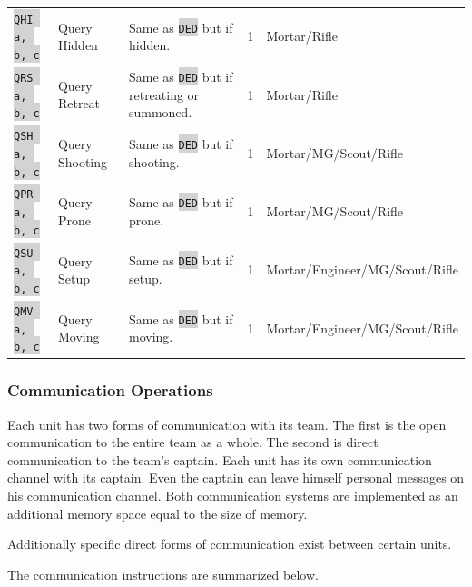 \documentclass{article}
\newcommand{\vnscode}[1]{\colorbox{lightgray}{\lstinline[language=vns]{#1}}}
\begin{document}
\begin{minipage}{\textwidth}
\begin{tabular}{lllll}
    \vnscode{QHI a, b, c} & Query Hidden & Same as \vnscode{DED} but if hidden. & 1 & Mortar/Rifle \\
    \vnscode{QRS a, b, c} & Query Retreat & Same as \vnscode{DED} but if retreating or summoned. & 1 & Mortar/Rifle \\
    \vnscode{QSH a, b, c} & Query Shooting & Same as \vnscode{DED} but if shooting. & 1 & Mortar/MG/Scout/Rifle \\
    \vnscode{QPR a, b, c} & Query Prone & Same as \vnscode{DED} but if prone. & 1 & Mortar/MG/Scout/Rifle \\
    \vnscode{QSU a, b, c} & Query Setup & Same as \vnscode{DED} but if setup. & 1 & Mortar/Engineer/MG/Scout/Rifle \\
    \vnscode{QMV a, b, c} & Query Moving & Same as \vnscode{DED} but if moving. & 1 & Mortar/Engineer/MG/Scout/Rifle \\
\end{tabular}
\end{minipage}

\subsubsection{Communication Operations}

Each unit has two forms of communication with its team. The first is the open
communication to the entire team as a whole. The second is direct communication
to the team's captain. Each unit has its own communication channel with its
captain. Even the captain can leave himself personal messages on his
communication channel. Both communication systems are implemented as an
additional memory space equal to the size of memory.

Additionally specific direct forms of communication exist between certain units.

The communication instructions are summarized below.
\end{document}

